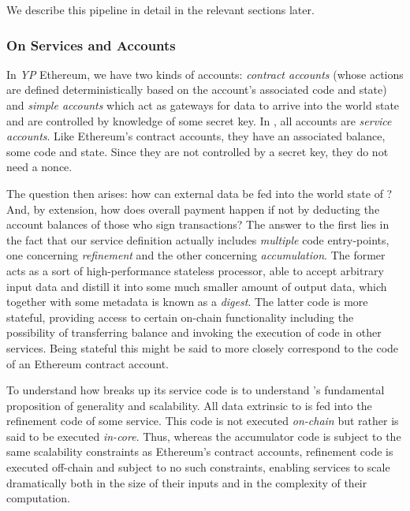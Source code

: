We describe this pipeline in detail in the relevant sections later.

\subsubsection{On Services and Accounts}


In \emph{YP} Ethereum, we have two kinds of accounts: \emph{contract accounts} (whose actions are defined deterministically based on the account's associated code and state) and \emph{simple accounts} which act as gateways for data to arrive into the world state and are controlled by knowledge of some secret key. In \Jam, all accounts are \emph{service accounts}. Like Ethereum's contract accounts, they have an associated balance, some code and state. Since they are not controlled by a secret key, they do not need a nonce.

The question then arises: how can external data be fed into the world state of \Jam? And, by extension, how does overall payment happen if not by deducting the account balances of those who sign transactions? The answer to the first lies in the fact that our service definition actually includes \emph{multiple} code entry-points, one concerning \emph{refinement} and the other concerning \emph{accumulation}. The former acts as a sort of high-performance stateless processor, able to accept arbitrary input data and distill it into some much smaller amount of output data, which together with some metadata is known as a \emph{digest}. The latter code is more stateful, providing access to certain on-chain functionality including the possibility of transferring balance and invoking the execution of code in other services. Being stateful this might be said to more closely correspond to the code of an Ethereum contract account.

To understand how \Jam breaks up its service code is to understand \Jam's fundamental proposition of generality and scalability. All data extrinsic to \Jam is fed into the refinement code of some service. This code is not executed \emph{on-chain} but rather is said to be executed \emph{in-core}. Thus, whereas the accumulator code is subject to the same scalability constraints as Ethereum's contract accounts, refinement code is executed off-chain and subject to no such constraints, enabling \Jam services to scale dramatically both in the size of their inputs and in the complexity of their computation.

